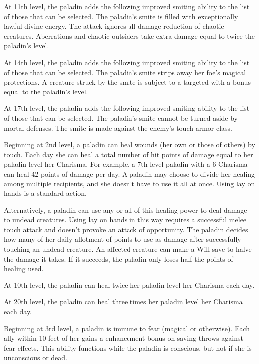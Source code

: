 At 11th level, the paladin adds the following improved smiting ability to the list of those that can be selected.
 The paladin's smite is filled with exceptionally lawful divine energy. The attack ignores all damage reduction of chaotic creatures. Aberrations and chaotic outsiders take extra damage equal to twice the paladin's level.

At 14th level, the paladin adds the following improved smiting ability to the list of those that can be selected.
 The paladin's smite strips away her foe's magical protections. A creature struck by the smite is subject to a targeted  with a bonus equal to the paladin's level.

At 17th level, the paladin adds the following improved smiting ability to the list of those that can be selected.
 The paladin's smite cannot be turned aside by mortal defenses. The smite is made against the enemy's touch armor class.

 Beginning at 2nd level, a paladin can heal wounds (her own or those of others) by touch. Each day she can heal a total number of hit points of damage equal to her paladin level \mtimes her Charisma. For example, a 7th-level paladin with a 6 Charisma can heal 42 points of damage per day. A paladin may choose to divide her healing among multiple recipients, and she doesn't have to use it all at once. Using lay on hands is a standard action.

\par Alternatively, a paladin can use any or all of this healing power to  deal damage to undead creatures. Using lay on hands in this way  requires a successful melee touch attack and doesn't provoke an attack of opportunity. The paladin decides how many of her daily allotment of points to use as damage after successfully touching an undead creature. An affected creature can make a Will save to halve the damage it takes. If it succeeds, the paladin only loses half the points of healing used.

At 10th level, the paladin can heal twice her paladin level \mtimes her Charisma each day.

At 20th level, the paladin can heal three times her paladin level \mtimes her Charisma each day.

    Beginning at 3rd level, a paladin is immune to fear (magical or otherwise). Each ally within 10 feet of her gains a  enhancement bonus on saving throws against fear effects. This ability functions while the paladin is conscious, but not if she is unconscious or dead.

